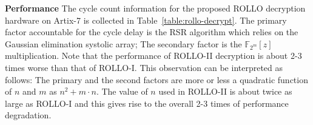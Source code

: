 \documentclass[submission]{iacrtrans}
\theoremstyle{plain}
\begin{document}
\textbf{Performance}
The cycle count information for the proposed ROLLO decryption hardware on Artix-7 is collected in Table~\ref{table:rollo-decrypt}. The primary factor accountable for the cycle delay is the RSR algorithm which relies on the Gaussian elimination systolic array; The secondary factor is the $\mathbb{F}_{2^m}[z]$ multiplication.
Note that the performance of ROLLO-II decryption is about 2-3 times worse than that of ROLLO-I. This observation can be interpreted as follows: The primary and the second factors are more or less a quadratic function of
$n$ and $m$ as $n^2+m\cdot n$. The value of $n$ used in ROLLO-II is about twice as large as ROLLO-I and this gives rise to the overall 2-3 times of performance degradation.

\begin{table}[!t]\centering
 \caption{Detailed cycle count analysis on ROLLO decryption/decapsulation for the claimed 128-bit/192-bit/256-bit security level (SL), respectively}
 \label{table:rollo-decrypt}
 \begin{minipage}{\textwidth}\centering
 \end{minipage}
 \vspace{-4mm}
 \end{table}
\end{document}
